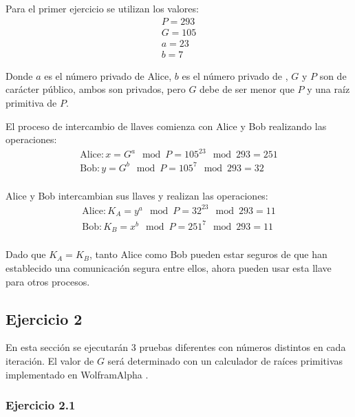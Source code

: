 \documentclass{article}
\begin{document}
            Para el primer ejercicio se utilizan los valores:
            \begin{gather*}
                P = 293 \\
                G = 105 \\
                a = 23 \\
                b = 7
            \end{gather*}

            Donde $a$ es el número privado de Alice, $b$ es el número privado de , $G$ y $P$ son de carácter público, ambos son privados, pero $G$ debe de ser menor que $P$ y una raíz primitiva de $P$.

            El proceso de intercambio de llaves comienza con Alice y Bob realizando las operaciones:
            \begin{gather*}
                \text{Alice}: x = G^{a} \mod{P} = 105^{23} \mod{293} = 251 \\
                \text{Bob}: y = G^{b} \mod{P} = 105^{7} \mod{293} = 32 \\
            \end{gather*}

            Alice y Bob intercambian sus llaves y realizan las operaciones:
            \begin{gather*}
                \text{Alice}: K_A = y^{a} \mod{P} = 32^{23} \mod{293} = 11 \\
                \text{Bob}: K_B = x^{b} \mod{P} = 251^{7} \mod{293} = 11 \\
            \end{gather*}

            Dado que $K_A = K_B$, tanto Alice como Bob pueden estar seguros de que han establecido una comunicación segura entre ellos, ahora pueden usar esta llave para otros procesos.

        \subsection*{Ejercicio 2}
            
            En esta sección se ejecutarán 3 pruebas diferentes con números distintos en cada iteración. El valor de $G$ será determinado con un calculador de raíces primitivas implementado en WolframAlpha \cite{edgeofinfinity-2017}.

            \subsubsection*{Ejercicio 2.1}
\end{document}
